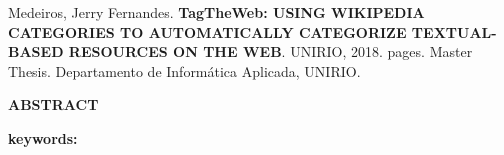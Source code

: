 Medeiros, Jerry Fernandes. \textbf{TagTheWeb: USING WIKIPEDIA CATEGORIES TO AUTOMATICALLY CATEGORIZE TEXTUAL-BASED RESOURCES ON THE WEB}. UNIRIO, 2018. \pageref{LastPage} pages. Master Thesis. Departamento de Informática Aplicada, UNIRIO.
\vspace{60pt}
\begin{center}
    \textbf{ABSTRACT}
    \vspace{60pt}
\end{center}



\vspace{20pt}

\textbf{keywords:}
